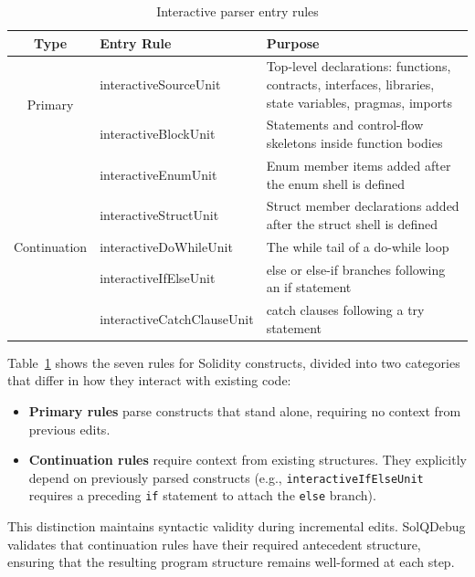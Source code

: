 \documentclass[pdflatex,sn-basic]{sn-jnl}%
\theoremstyle{thmstyleone}%
\theoremstyle{thmstyletwo}%
\theoremstyle{thmstylethree}%
\begin{document}
\begin{table}[t]
\centering
\caption{Interactive parser entry rules}
\label{tab:interactive-rules}
\small
\begin{tabular}{@{}c|lp{8cm}@{}}
\toprule
\textbf{Type} & \textbf{Entry Rule} & \textbf{Purpose} \\
\midrule
\multirow{2}{*}[-10pt]{Primary} & interactiveSourceUnit & Top-level declarations: functions, contracts, interfaces, libraries, state variables, pragmas, imports \\
& interactiveBlockUnit & Statements and control-flow skeletons inside function bodies \\
\midrule
\multirow{5}{*}[-8pt]{Continuation} & interactiveEnumUnit & Enum member items added after the enum shell is defined \\
& interactiveStructUnit & Struct member declarations added after the struct shell is defined \\
& interactiveDoWhileUnit & The while tail of a do-while loop \\
& interactiveIfElseUnit & else or else-if branches following an if statement \\
& interactiveCatchClauseUnit & catch clauses following a try statement \\
\bottomrule
\end{tabular}
\end{table}

Table~\ref{tab:interactive-rules} shows the seven rules for Solidity constructs, divided into two categories
that differ in how they interact with existing code:

\begin{itemize}
  \item \textbf{Primary rules} parse constructs that stand alone, requiring no context
        from previous edits.

  \item \textbf{Continuation rules} require context from existing structures. They explicitly
        depend on previously parsed constructs (e.g., \texttt{interactiveIfElseUnit} requires
        a preceding \texttt{if} statement to attach the \texttt{else} branch).
\end{itemize}

This distinction maintains syntactic validity during incremental edits.
SolQDebug validates that continuation rules have their required antecedent structure,
ensuring that the resulting program structure remains well-formed at each step.
\end{document}
